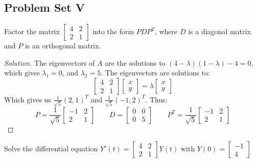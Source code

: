\documentclass[../main.tex]{subfiles}
\begin{document}
\subsection{Problem Set V}
%
\begin{problem}
Factor the matrix $\begin{bmatrix} 4 & 2 \\ 2 & 1 \end{bmatrix}$ into the form $PDP^T$, where $D$ is a diagonal matrix and $P$ is an orthogonal matrix.
\end{problem}
\begin{proof}[Solution]
The eigenvectors of $A$ are the solutions to $(4-\lambda)(1-\lambda)-4=0$, which gives $\lambda_1 = 0$, and $\lambda_2 = 5$. The eigenvectors are solutions to:
%
\begin{equation*}
    \begin{bmatrix} 4 & 2 \\ 2 & 1 \end{bmatrix} \begin{bmatrix} x \\ y \end{bmatrix} = \lambda \begin{bmatrix} x \\ y \end{bmatrix}
\end{equation*}
%
Which gives us $\frac{1}{\sqrt{5}}(2,1)^T$ and $\frac{1}{\sqrt{5}}(-1,2)^T$. Thus:
%
\begin{equation*}
    P = \frac{1}{\sqrt{5}}\begin{bmatrix} -1 & 2 \\ 2 & 1 \end{bmatrix}\quad\quad D = \begin{bmatrix} 0 & 0 \\ 0 & 5 \end{bmatrix}\quad\quad P^{T} = \frac{1}{\sqrt{5}}\begin{bmatrix} -1 & 2 \\ 2 & 1 \end{bmatrix}
\end{equation*}
\end{proof}
%
\begin{problem}
Solve the differential equation $Y'(t) = \begin{bmatrix} 4 & 2 \\ 2 & 1 \end{bmatrix} Y(t)$ with $Y(0) = \begin{bmatrix} -1 \\ 4 \end{bmatrix}$
\end{problem}
\end{document}
